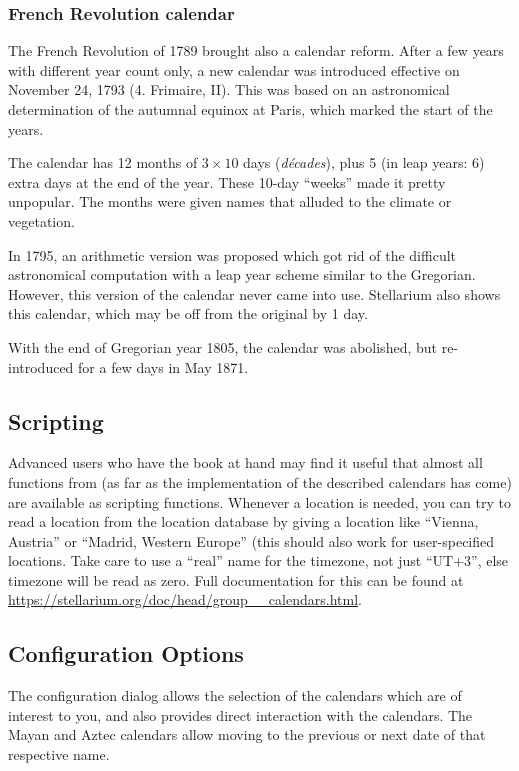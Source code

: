 \subsubsection{French Revolution calendar}
The French Revolution of 1789 brought also a calendar reform. After a
few years with different year count only, a new calendar was
introduced effective on November 24, 1793 (4. Frimaire, II). This was
based on an astronomical determination of the autumnal equinox at
Paris, which marked the start of the years.

The calendar has 12 months of $3\times 10$ days (\emph{d\'ecades}), plus
5 (in leap years: 6) extra days at the end of the year. These 10-day
``weeks'' made it pretty unpopular. The months were given names that
alluded to the climate or vegetation.

In 1795,  an arithmetic version was proposed which
got rid of the difficult astronomical computation with a leap year
scheme similar to the Gregorian. However, this version of the calendar
never came into use.  Stellarium also shows this calendar, which
may be off from the original by 1 day.

With the end of Gregorian year 1805, the calendar was abolished, but
re-introduced for a few days in May 1871.

\subsection{Scripting}

Advanced users who have the book at hand may find it useful
that almost all functions from
\cite{Reingold-Dershowitz:2018} (as far as the implementation of the
described calendars has come) are available as scripting
functions. Whenever a location is needed, you can try to read a
location from the location database by giving a location like
``Vienna, Austria'' or ``Madrid, Western Europe'' (this should also
work for user-specified locations. Take care to use a ``real'' name
for the timezone, not just ``UT+3'', else timezone will be read as
zero. Full documentation for this can be found at
\url{https://stellarium.org/doc/head/group__calendars.html}.

\subsection{Configuration Options}
\label{sec:plugin:Calendars:configuration}

The configuration dialog allows the selection of the calendars which are
of interest to you, and also provides direct interaction with the calendars.
The Mayan and Aztec calendars allow moving to the previous or next date of that respective name. 

